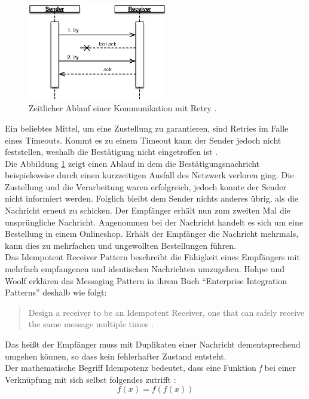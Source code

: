 \begin{figure}[H]
 \centering
 \includegraphics[width=0.54\textwidth]{4-Hauptteil/idempotent-receiver/sequence-failed-ack.eps}
 \caption{Zeitlicher Ablauf einer Kommunikation mit Retry \cite[S.~528]{hohpe_enterprise_2004}.}
 \label{fig:failed-ack}
\end{figure}

Ein beliebtes Mittel, um eine Zustellung zu garantieren, sind Retries im Falle eines Timeouts. Kommt es zu einem Timeout kann der Sender jedoch nicht feststellen, weshalb die Bestätigung nicht eingetroffen ist \cite[S.~382]{vernon_reactive_2016} \cite[S.~528]{hohpe_enterprise_2004}.\\
Die Abbildung \ref{fig:failed-ack} zeigt einen Ablauf in dem die Bestätigungsnachricht beispielsweise durch einen kurzzeitigen Ausfall des Netzwerk verloren ging. Die Zustellung und die Verarbeitung waren erfolgreich, jedoch konnte der Sender nicht informiert werden. Folglich bleibt dem Sender nichts anderes übrig, als die Nachricht erneut zu schicken. Der Empfänger erhält nun zum zweiten Mal die unsprüngliche Nachricht. Angenommen bei der Nachricht handelt es sich um eine Bestellung in einem Onlineshop. Erhält der Empfänger die Nachricht mehrmals, kann dies zu mehrfachen und ungewollten Bestellungen führen.\\
Das Idempotent Receiver Pattern beschreibt die Fähigkeit eines Empfängers mit mehrfach empfangenen und identischen Nachrichten umzugehen. Hohpe und Woolf erklären das Messaging Pattern in ihrem Buch \enquote{Enterprise Integration Patterns} deshalb wie folgt:

\begin{quotation}
Design a receiver to be an Idempotent Receiver, one that can safely receive the same message multiple times \cite[S.~529]{hohpe_enterprise_2004}.
\end{quotation}

Das heißt der Empfänger muss mit Duplikaten einer Nachricht dementsprechend umgehen können, so dass kein fehlerhafter Zustand entsteht.\\
Der mathematische Begriff Idempotenz bedeutet, dass eine Funktion \textit{f} bei einer Verknüpfung mit sich selbst folgendes zutrifft \cite[S.~529]{hohpe_enterprise_2004}:
\[f(x) = f(f(x))\]

